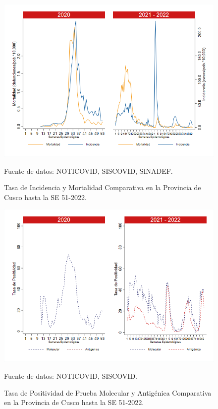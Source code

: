 \documentclass[12pt,a4paper,openany]{book}
\begin{document}
	\begin{figure}[h]
		\caption{Tasa de Incidencia y Mortalidad Comparativa en la Provincia de Cusco hasta la SE 51-2022.}\label{fig:inc_mort_cusco}
		\begin{center}
			\includegraphics[width=0.85\linewidth]{../figuras/incidencia_mortalidad_20_21_7.png}
		\end{center}
		{\footnotesize {Fuente de datos: NOTICOVID, SISCOVID, SINADEF.}}
	\end{figure}
	
	\begin{figure}[h]
		\caption{Tasa de Positividad de Prueba Molecular y Antigénica Comparativa en la Provincia de Cusco hasta la SE 51-2022.}\label{fig:positividad_cusco}
		\begin{center}
			\includegraphics[width=0.7\linewidth]{../figuras/positividad_20_21_7.png}
		\end{center}
		{\footnotesize {Fuente de datos: NOTICOVID, SISCOVID.}}
	\end{figure}
	
\end{document}
